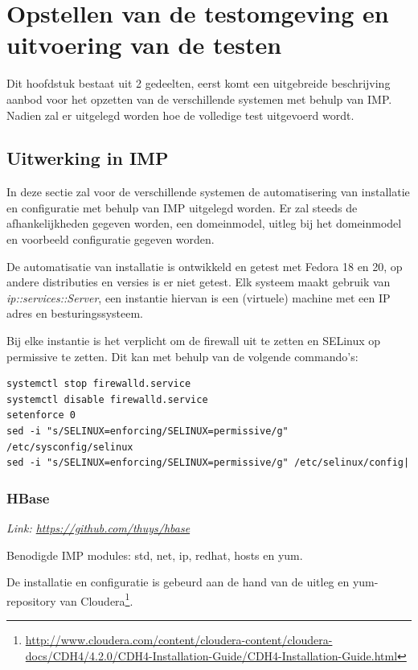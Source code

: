 \chapter{Opstellen van de testomgeving en uitvoering van de testen} \label{chap:AppendixUitwerkingIMP}

Dit hoofdstuk bestaat uit 2 gedeelten, eerst komt een uitgebreide beschrijving aanbod voor het opzetten van de verschillende systemen met behulp van IMP. Nadien zal er uitgelegd worden hoe de volledige test uitgevoerd wordt. 

\section{Uitwerking in IMP}
In deze sectie zal voor de verschillende systemen de automatisering van installatie en configuratie met behulp van IMP uitgelegd worden. Er zal steeds de afhankelijkheden gegeven worden, een domeinmodel, uitleg bij het domeinmodel en voorbeeld configuratie gegeven worden. 

De automatisatie van installatie is ontwikkeld en getest met Fedora 18 en 20, op andere distributies en versies is er niet getest. 
Elk systeem maakt gebruik van \textit{ip::services::Server}, een instantie hiervan is een (virtuele) machine met een IP adres en besturingssysteem. 

Bij elke instantie is het verplicht om de firewall uit te zetten en SELinux op permissive te zetten. Dit kan met behulp van de volgende commando's: 
\begin{lstlisting}[frame=single, breaklines=true]
systemctl stop firewalld.service  
systemctl disable firewalld.service  
setenforce 0
sed -i "s/SELINUX=enforcing/SELINUX=permissive/g" /etc/sysconfig/selinux
sed -i "s/SELINUX=enforcing/SELINUX=permissive/g" /etc/selinux/config|
\end{lstlisting}

\subsection{HBase}
\textit{Link: \url{https://github.com/thuys/hbase}}

Benodigde IMP modules: std, net, ip, redhat, hosts en yum. 

De installatie en configuratie is gebeurd aan de hand van de uitleg en yum-repository van Cloudera\footnote{\url{http://www.cloudera.com/content/cloudera-content/cloudera-docs/CDH4/4.2.0/CDH4-Installation-Guide/CDH4-Installation-Guide.html}}. 

